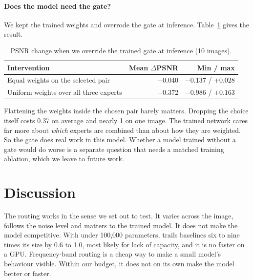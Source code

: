 \paragraph{Does the model need the gate?} We kept the trained weights and
overrode the gate at inference. Table~\ref{tab:interventions} gives the
result.

\begin{table}[htbp]
	\centering
	\caption{PSNR change when we override the trained gate at inference (10 images).}
	\label{tab:interventions}
	\small
	\begin{tabular}{@{}lrr@{}}
		\toprule
		Intervention & Mean $\Delta$PSNR & Min / max \\
		\midrule
		Equal weights on the selected pair     & $-0.040$\dB & $-0.137$ / $+0.028$ \\
		Uniform weights over all three experts & $-0.372$\dB & $-0.986$ / $+0.163$ \\
		\bottomrule
	\end{tabular}
\end{table}

Flattening the weights inside the chosen pair barely matters. Dropping the
choice itself costs 0.37\dB{} on average and nearly 1\dB{} on one image. The
trained network cares far more about \emph{which} experts are combined than
about how they are weighted. So the gate does real work in this model.
Whether a model trained without a gate would do worse is a separate question
that needs a matched training ablation, which we leave to future work.

\section{Discussion}\label{sec:discussion}

The routing works in the sense we set out to test. It varies across the
image, follows the noise level and matters to the trained model. It does not
make the model competitive. With under 100,000 parameters, \fcsg{} trails
baselines six to nine times its size by 0.6 to 1.0\dB{}, most likely for lack
of capacity, and it is no faster on a GPU. Frequency-band routing is a cheap
way to make a small model's behaviour visible. Within our budget, it does not
on its own make the model better or faster.
